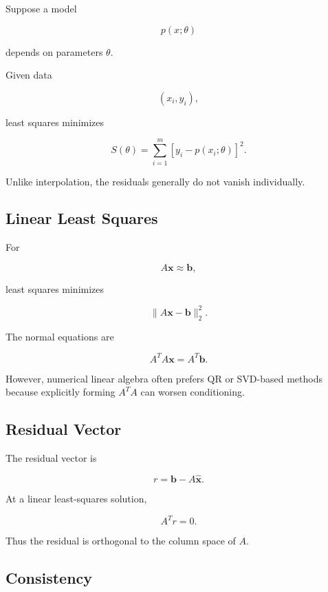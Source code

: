 Suppose a model

\[
p(x;\theta)
\]

depends on parameters \(\theta\).

Given data

\[
(x_i,y_i),
\]

least squares minimizes

\[
\boxed{
S(\theta)
=
\sum_{i=1}^{m}
[
y_i-p(x_i;\theta)
]^2.
}
\]

Unlike interpolation, the residuals generally do not vanish individually.

\subsection{Linear Least Squares}
\label{subsec:linear-least-squares-review}

For

\[
A\mathbf{x}
\approx
\mathbf{b},
\]

least squares minimizes

\[
\boxed{
\|A\mathbf{x}-\mathbf{b}\|_2^2.
}
\]

The normal equations are

\[
\boxed{
A^TA\mathbf{x}
=
A^T\mathbf{b}.
}
\]

However, numerical linear algebra often prefers QR or SVD-based methods
because explicitly forming \(A^TA\) can worsen conditioning.

\subsection{Residual Vector}
\label{subsec:least-squares-residual-vector}

The residual vector is

\[
\boxed{
r
=
\mathbf{b}
-
A\widehat{\mathbf{x}}.
}
\]

At a linear least-squares solution,

\[
\boxed{
A^Tr=0.
}
\]

Thus the residual is orthogonal to the column space of \(A\).

\subsection{Consistency}
\label{subsec:numerical-consistency}

